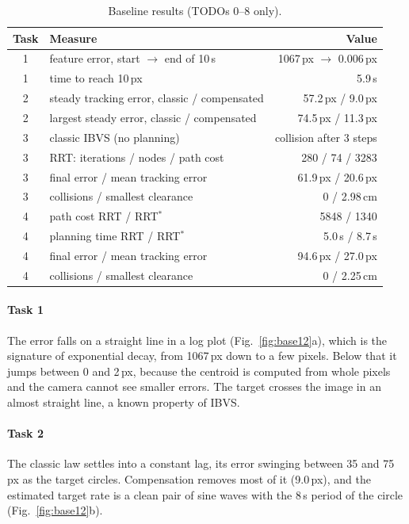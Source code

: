 \documentclass[11pt,a4paper]{article}
\begin{document}
\begin{table}[htbp]
\centering\small
\caption{Baseline results (TODOs 0--8 only).}\label{tab:baseline}
\begin{tabular}{@{}clr@{}}
\toprule
Task & Measure & Value\\
\midrule
1 & feature error, start $\rightarrow$ end of 10\,s & 1067\,px $\rightarrow$ 0.006\,px\\
1 & time to reach 10\,px & 5.9\,s\\
2 & steady tracking error, classic / compensated & 57.2\,px / 9.0\,px\\
2 & largest steady error, classic / compensated & 74.5\,px / 11.3\,px\\
3 & classic IBVS (no planning) & collision after 3 steps\\
3 & RRT: iterations / nodes / path cost & 280 / 74 / 3283\\
3 & final error / mean tracking error & 61.9\,px / 20.6\,px\\
3 & collisions / smallest clearance & 0 / 2.98\,cm\\
4 & path cost RRT / RRT$^{*}$ & 5848 / 1340\\
4 & planning time RRT / RRT$^{*}$ & 5.0\,s / 8.7\,s\\
4 & final error / mean tracking error & 94.6\,px / 27.0\,px\\
4 & collisions / smallest clearance & 0 / 2.25\,cm\\
\bottomrule
\end{tabular}
\end{table}

\paragraph{Task 1} The error falls on a straight line in a log plot (Fig.~\ref{fig:base12}a), which is
the signature of exponential decay, from 1067\,px down to a few pixels. Below that it jumps between 0
and 2\,px, because the centroid is computed from whole pixels and the camera cannot see smaller
errors. The target crosses the image in an almost straight line, a known property of IBVS.

\paragraph{Task 2} The classic law settles into a constant lag, its error swinging between 35 and
75\,px as the target circles. Compensation removes most of it (9.0\,px), and the estimated target rate
is a clean pair of sine waves with the 8\,s period of the circle (Fig.~\ref{fig:base12}b).
\end{document}
